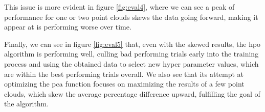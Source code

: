 This issue is more evident in figure \ref{fig:eval4}, where we can see a peak of performance for one or two point clouds skews the data going forward, making it appear at is performing worse over time.

Finally, we can see in figure \ref{fig:eval5} that, even with the skewed results, the \acrshort{hpo} algorithm is performing well, culling bad performing trials early into the training process and using the obtained data to select new hyper parameter values, which are within the best performing trials overall. We also see that its attempt at optimizing the \acrshort{pca} function focuses on maximizing the results of a few point clouds, which skew the average percentage difference upward, fulfilling the goal of the algorithm.